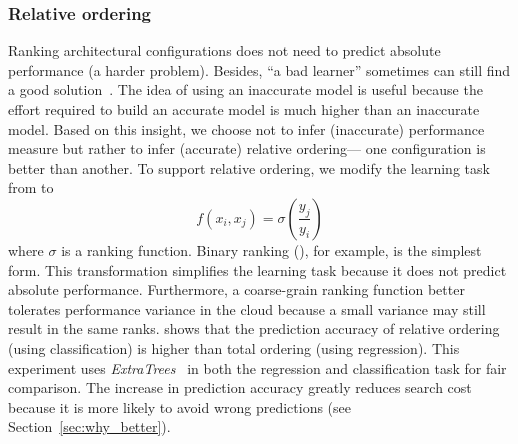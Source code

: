 \subsubsection*{Relative ordering}
Ranking architectural configurations does not need to predict
absolute performance (a harder problem).
Besides, ``a bad learner'' sometimes can still find a good solution~\cite{nair2017}. 
The idea of using an inaccurate model is useful
because the effort required to build an accurate model is much higher than
an inaccurate model.
Based on this insight, we choose not to infer (inaccurate) performance measure
but rather to infer (accurate) relative ordering---
one configuration is better than another.
To support relative ordering, we modify the learning task from
\myequation{\ref{eq:1}} to
\begin{equation} \label{eq:2}
f(x_i, x_j) = \sigma({\frac{y_j}{y_i}})
\end{equation}
where $\sigma$ is a ranking function.
Binary ranking (), for example, is the simplest form.
This transformation simplifies the learning task because
it does not predict absolute performance.
Furthermore, a coarse-grain ranking function better tolerates
performance variance in the cloud because
a small variance may still result in the same ranks.
\myfigure{\ref{fig:reg_clas}} shows that the prediction accuracy of
relative ordering (using classification) is higher than
total ordering (using regression).
This experiment uses \emph{ExtraTrees}~\cite{geurts2006extremely} in
both the regression and classification task for fair comparison.
The increase in prediction accuracy greatly reduces search cost because
it is more likely to avoid wrong predictions (see Section~\ref{sec:why_better}).


